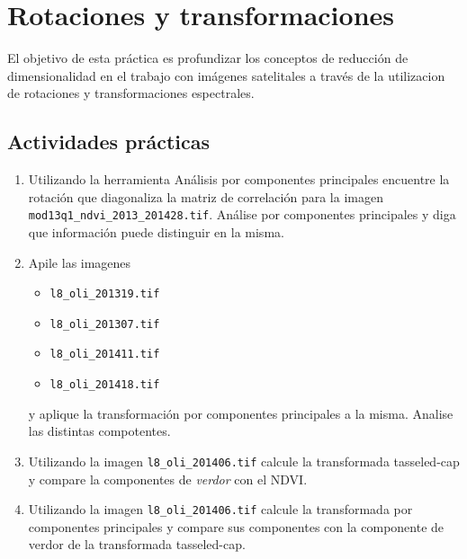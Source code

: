 \documentclass[hidelinks,12pt]{article}
\begin{document}
\section{Rotaciones y transformaciones}
El objetivo de esta práctica es  profundizar los conceptos de reducción
de dimensionalidad en el trabajo con imágenes satelitales a través de la
utilizacion de rotaciones y transformaciones espectrales.

\subsection{Actividades pr\'acticas}\label{rot:pra}
\begin{enumerate}
    \item Utilizando la herramienta Análisis por componentes principales
        encuentre la rotación que diagonaliza la matriz de correlación para la
        imagen \texttt{mod13q1\_ndvi\_2013\_2014\-28.tif}. Análise 
        por componentes principales y diga que información puede distinguir en la 
        misma. 
    \item \label{pca} Apile las imagenes
        \begin{itemize}
        \item \texttt{l8\_oli\_2013\-19.tif}
        \item \texttt{l8\_oli\_2013\-07.tif}
        \item \texttt{l8\_oli\_2014\-11.tif}
        \item \texttt{l8\_oli\_2014\-18.tif}
        \end{itemize}
        y aplique la transformaci\'on por componentes principales a la misma.
        Analise las distintas compotentes.
    \item Utilizando la imagen \texttt{l8\_oli\_2014\-06.tif} calcule la 
        transformada tasseled-cap y compare la componentes de \emph{verdor} con
        el NDVI\@.
    \item Utilizando la imagen \texttt{l8\_oli\_2014\-06.tif} calcule la 
        transformada por componentes principales y compare sus componentes con la
        componente de verdor de la transformada tasseled-cap.
\end{enumerate}
\end{document}
